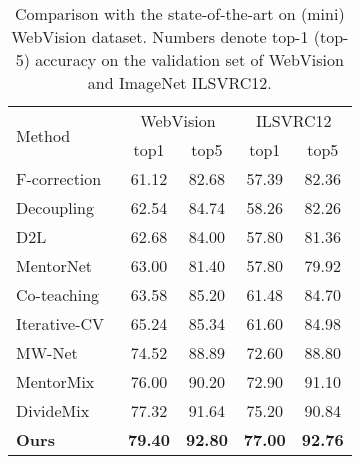\documentclass[final]{cvpr}
\begin{document}
\begin{table}[t]
	\centering
	\small
	\begin{tabular}{|l|c|c|c|c|}
		\hline
		\multirow{2}{*}{Method} & \multicolumn{2}{|c|}{WebVision} & \multicolumn{2}{|c|}{ILSVRC12}\\
		                        \cline{2-5}
		                        & top1 & top5 & top1 & top5 \\
        \hline		                        
	    F-correction~\cite{patrini2017making} & 61.12 & 82.68 & 57.39 & 82.36 \\
        \hline
        Decoupling~\cite{malach2017decoupling} & 62.54 & 84.74 & 58.26 & 82.26 \\
        \hline
        D2L~\cite{ma2018dimensionality} & 62.68 & 84.00 & 57.80 & 81.36 \\
        \hline
        MentorNet~\cite{jiang2017mentornet} & 63.00 & 81.40 & 57.80 & 79.92 \\
        \hline
        Co-teaching~\cite{han2018co} & 63.58 & 85.20  & 61.48 & 84.70 \\
        \hline
        Iterative-CV~\cite{chen2019understanding} & 65.24 & 85.34 & 61.60 & 84.98 \\
        \hline
		MW-Net~\cite{shu2019meta} & 74.52 & 88.89 & 72.60 & 88.80 \\
		\hline
        MentorMix~\cite{jiang2020beyond} & 76.00 & 90.20 & 72.90 & 91.10 \\ 
		\hline
        DivideMix~\cite{li2020dividemix} & 77.32 & 91.64 &	75.20 & 90.84 \\

		\hline\hline
        \textbf{Ours} & \textbf{79.40} & \textbf{92.80} & \textbf{77.00} & \textbf{92.76} \\
		\hline
	\end{tabular}
	\vspace{-1mm}
	\caption{Comparison with the state-of-the-art on (mini) WebVision dataset. Numbers denote top-1 (top-5) accuracy on the validation set of WebVision and ImageNet ILSVRC12.
	}\label{tab:webvision}
\end{table}
 
\end{document}
